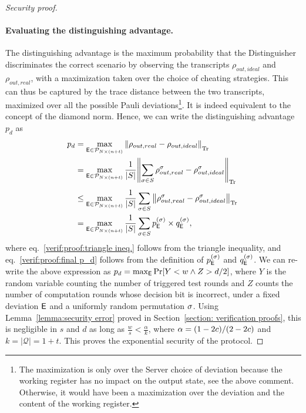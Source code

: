 \begin{proof}[Security proof]
    \paragraph{Evaluating the distinguishing advantage.}
    The distinguishing advantage is the maximum probability that the Distinguisher discriminates the correct scenario by observing the transcripts $\rho_{out, ideal}$ and $\rho_{out, real}$, with a maximization taken over the choice of cheating strategies.
    This can thus be captured by the trace distance between the two transcripts, maximized over all the possible Pauli deviations\footnote{The maximization is only over the Server choice of deviation because the working register has no impact on the output state, see the above comment. Otherwise, it would have been a maximization over the deviation and the content of the working register.}. It is indeed equivalent to the concept of the diamond norm. Hence, we can write the distinguishing advantage $p_d$ as
    \begin{align}
        p_d
        &= \max_{\mathsf{E}\in\mathcal{P}_{N\times(n+t)}}
        \norm{\rho_{out, real}-\rho_{out, ideal}}_{\Tr\strut}
        \\
        &=
        \max_{\mathsf{E}\in\mathcal{P}_{N\times(n+t)}}
        \frac{1}{|S|}
        \norm{\sum_{\sigma \in S} \rho_{out, real}^\sigma-\rho_{out, ideal}^\sigma}_{\Tr\strut}
        \\
        \label{verif:proof:triangle ineq.}
        &\leq
        \max_{\mathsf{E}\in\mathcal{P}_{N\times(n+t)}}
        \frac{1}{|S|}
        \sum_{\sigma \in S}
        \norm{
             \rho_{out, real}^\sigma-\rho_{out, ideal}^\sigma}_{\Tr\strut}
        \\
        \label{verif:proof:final p_d}
        &=
        \max_{\mathsf{E}\in\mathcal{P}_{N\times(n+t)}}
        \frac{1}{|S|}
        \sum_{\sigma \in S}
            p_{\mathsf{E}}^{(\sigma)}\times q_{\mathsf{E}}^{(\sigma)},
    \end{align}
    where eq.~\ref{verif:proof:triangle ineq.} follows from the triangle inequality, and eq.~\ref{verif:proof:final p_d} follows from the definition of $p_{\mathsf{E}}^{(\sigma)}$ and $q_{\mathsf{E}}^{(\sigma)}$.
    We can re-write the above expression as
    $p_d = \max_{\mathsf{E}} \Pr[Y < w \wedge Z > d/2]$, where $Y$ is the random variable counting
    the number of triggered test rounds and $Z$ counts the number of computation rounds
    whose decision bit is incorrect, under a fixed deviation $\mathsf{E}$ and a uniformly random
    permutation $\sigma$.
    Using Lemma~\ref{lemma:security error} proved in Section~\ref{section: verification proofs}, this is negligible in $s$ and $d$ as long as $\tfrac w s< \tfrac\alpha k$, where $\alpha = (1-2c)/(2-2c)$ and $k=|\mathcal Q|=1+t$. This proves the exponential security of the protocol.
\end{proof}

